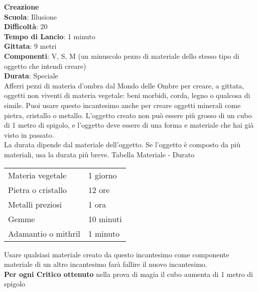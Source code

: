 \begin{multicols}{2}
\medskip\textbf{Creazione}\\
\textbf{Scuola}: Illusione\\
\textbf{Difficoltà}:  20\\
\textbf{Tempo di Lancio}: 1 minuto\\
\textbf{Gittata}: 9 metri\\
\textbf{Componenti}: V, S, M (un minuscolo pezzo di materiale dello stesso tipo di oggetto che intendi creare) \\
\textbf{Durata}: Speciale\\
Afferri pezzi di materia d’ombra dal Mondo delle Ombre per creare, a gittata, oggetti non viventi di materia vegetale: beni morbidi, corda, legno o qualcosa di simile. Puoi usare questo incantesimo anche per creare oggetti minerali come pietra, cristallo o metallo. L’oggetto creato non può essere più grosso di un cubo di 1 metro di spigolo, e l’oggetto deve essere di una forma e materiale che hai già visto in passato.\\
La durata dipende dal materiale dell'oggetto. Se l’oggetto è composto da più materiali, usa la durata più breve.
\medskip
Tabella Materiale - Durato
\medskip

\begin{tabularx}{0.45\textwidth}{lX}
	\hline 
Materia vegetale &1 giorno\\
Pietra o cristallo &12 ore\\
Metalli preziosi &1 ora\\
Gemme &10 minuti\\
Adamantio o mithril &1 minuto\\
\end{tabularx} 
\medskip

Usare qualsiasi materiale creato da questo incantesimo come componente materiale di un altro incantesimo farà fallire il nuovo incantesimo.\\
\textbf{Per ogni Critico ottenuto} nella prova di magia il cubo aumenta di 1 metro di spigolo


\end{multicols}
